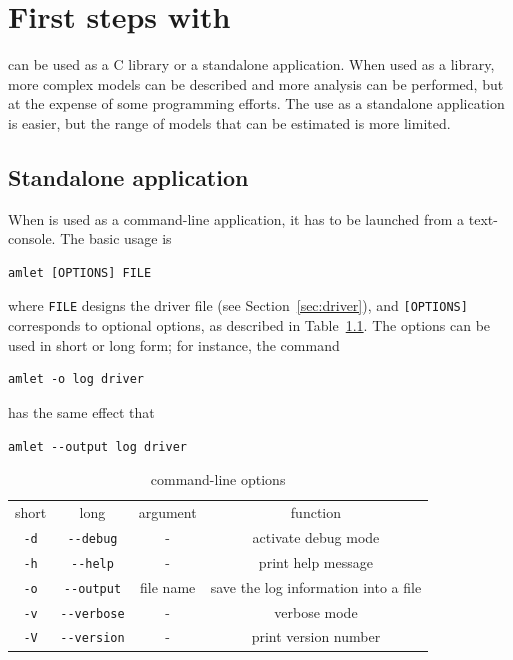 \chapter{First steps with \amlet{}}
\label{ch:launch}

\amlet{} can be used as a C library or a standalone application.
When used as a library, more complex models can be described and more analysis can be performed, but at the expense of some programming efforts.
The use as a standalone application is easier, but the range of models that can be estimated is more limited.

\section{Standalone application}

When \amlet{} is used as a command-line application, it has to be launched
from a text-console.
The basic usage is
\begin{verbatim}
amlet [OPTIONS] FILE
\end{verbatim}
where \verb|FILE| designs the driver file (see
Section~\ref{sec:driver}), and \verb|[OPTIONS]| corresponds to
optional options, as described in Table~\ref{tab:options}. The
options can be used in short or long form; for instance, the command
\begin{verbatim}
amlet -o log driver
\end{verbatim}
has the same effect that
\begin{verbatim}
amlet --output log driver
\end{verbatim}

\begin{table}[htb]
\begin{center}
\begin{tabular}{|c|c|c|c|}
\hline
short & long & argument & function \\
\verb|-d| & \verb|--debug| & - & activate debug mode \\
\hline
\verb|-h| & \verb|--help| & - & print help message \\
\hline
\verb|-o| & \verb|--output| & file name
& save the log information into a file \\
\hline
\verb|-v| & \verb|--verbose| & - & verbose mode \\
\hline
\verb|-V| & \verb|--version| & - & print version number \\
\hline
\end{tabular}
\caption{command-line options}
\label{tab:options}
\end{center}
\end{table}

